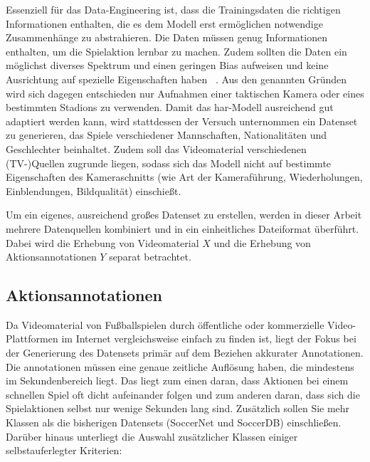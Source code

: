 Essenziell für das Data-Engineering ist, dass die Trainingsdaten die richtigen Informationen enthalten, die es dem Modell erst ermöglichen notwendige Zusammenhänge zu abstrahieren.
Die Daten müssen genug Informationen enthalten, um die Spielaktion lernbar zu machen.
Zudem sollten die Daten ein möglichst diverses Spektrum und einen geringen Bias aufweisen und keine Ausrichtung auf spezielle Eigenschaften haben ~\cite{Gugger20}.
Aus den genannten Gründen wird sich dagegen entschieden nur Aufnahmen einer taktischen Kamera oder eines bestimmten Stadions zu verwenden.
Damit das \gls{har}-Modell ausreichend gut adaptiert werden kann, wird stattdessen der Versuch unternommen ein Datenset zu generieren, das Spiele verschiedener Mannschaften, Nationalitäten und Geschlechter beinhaltet.
Zudem soll das Videomaterial verschiedenen (TV-)Quellen zugrunde liegen, sodass sich das Modell nicht auf bestimmte Eigenschaften des Kameraschnitts (wie Art der Kameraführung, Wiederholungen, Einblendungen, Bildqualität) einschießt.

Um ein eigenes, ausreichend großes Datenset zu erstellen, werden in dieser Arbeit mehrere Datenquellen kombiniert und in ein einheitliches Dateiformat überführt.
Dabei wird die Erhebung von Videomaterial $X$ und die Erhebung von Aktionsannotationen $Y$ separat betrachtet.

\subsection{Aktionsannotationen}
\label{subsec:aktionsannotationen}

Da Videomaterial von Fußballspielen durch öffentliche oder kommerzielle Video-Plattformen im Internet vergleichsweise einfach zu finden ist, liegt der Fokus bei der Generierung des Datensets primär auf dem Beziehen akkurater Annotationen.
Die \gls{annotationen} müssen eine genaue zeitliche Auflösung haben, die mindestens im Sekundenbereich liegt.
Das liegt zum einen daran, dass Aktionen bei einem schnellen Spiel oft dicht aufeinander folgen und zum anderen daran, dass sich die Spielaktionen selbst nur wenige Sekunden lang sind.
Zusätzlich sollen Sie mehr Klassen als die bisherigen Datensets (SoccerNet und SoccerDB) einschließen.
Darüber hinaus unterliegt die Auswahl zusätzlicher Klassen einiger selbstauferlegter Kriterien:

